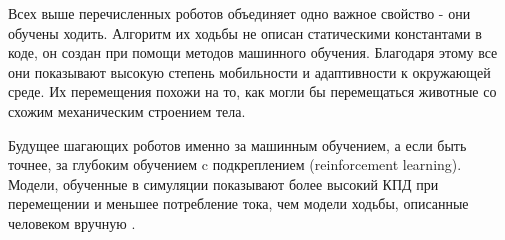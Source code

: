 Всех выше перечисленных роботов объединяет одно важное свойство - они обучены ходить. Алгоритм их ходьбы не описан статическими константами в коде, он создан при помощи методов машинного обучения. Благодаря этому все они показывают высокую степень мобильности и адаптивности к окружающей среде. Их перемещения похожи на то, как могли бы перемещаться животные со схожим механическим строением тела.

Будущее шагающих роботов именно за машинным обучением, а если быть точнее, за глубоким обучением c подкреплением (reinforcement learning). Модели, обученные в симуляции показывают более высокий КПД при перемещении и меньшее потребление тока, чем модели ходьбы, описанные человеком вручную \cite{Hwangbo2019}. 